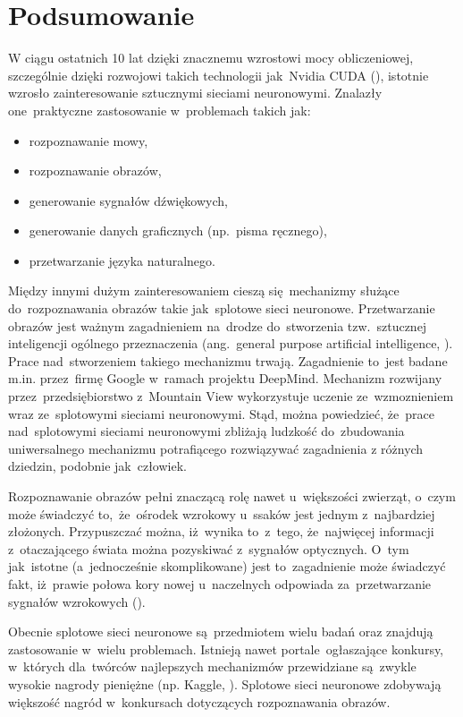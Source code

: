 \chapter{Podsumowanie}
W ciągu ostatnich 10 lat dzięki znacznemu wzrostowi mocy obliczeniowej, szczególnie dzięki rozwojowi takich technologii
jak~Nvidia CUDA (\cite{nvidia-cuda}), istotnie wzrosło zainteresowanie sztucznymi sieciami neuronowymi. Znalazły
one~praktyczne zastosowanie w~problemach takich jak:
\begin{itemize}
    \item rozpoznawanie mowy,
    \item rozpoznawanie obrazów,
    \item generowanie sygnałów dźwiękowych,
    \item generowanie danych graficznych (np.~pisma ręcznego),
    \item przetwarzanie języka naturalnego.
\end{itemize}

Między innymi dużym zainteresowaniem cieszą się~mechanizmy służące do~rozpoznawania obrazów takie jak~splotowe sieci
neuronowe. Przetwarzanie obrazów jest ważnym zagadnieniem na~drodze do~stworzenia tzw.~sztucznej inteligencji ogólnego
przeznaczenia (ang.~general purpose artificial intelligence, \cite{strong-AI}). Prace nad~stworzeniem takiego mechanizmu
trwają. Zagadnienie to~jest badane m.in. przez~firmę Google w~ramach projektu DeepMind. Mechanizm rozwijany
przez~przedsiębiorstwo z~Mountain View wykorzystuje uczenie ze~wzmoznieniem wraz ze~splotowymi sieciami neuronowymi.
Stąd, można powiedzieć, że~prace nad~splotowymi sieciami neuronowymi zbliżają ludzkość do~zbudowania uniwersalnego
mechanizmu potrafiącego rozwiązywać zagadnienia z różnych dziedzin, podobnie jak~człowiek.

Rozpoznawanie obrazów pełni znaczącą rolę nawet u~większości zwierząt, o~czym może świadczyć to,~że~ośrodek wzrokowy
u~ssaków jest jednym z~najbardziej złożonych. Przypuszczać można, iż~wynika to~z~tego, że~najwięcej informacji
z~otaczającego świata można pozyskiwać z~sygnałów optycznych. O~tym jak~istotne (a~jednocześnie skomplikowane) jest
to~zagadnienie może świadczyć fakt, iż~prawie połowa kory nowej u~naczelnych odpowiada za~przetwarzanie sygnałów
wzrokowych (\cite{primate-cerebral-cortex}).

Obecnie splotowe sieci neuronowe są~przedmiotem wielu badań oraz znajdują zastosowanie w~wielu problemach. Istnieją
nawet portale~ogłaszające konkursy, w~których dla~twórców najlepszych mechanizmów przewidziane są~zwykle wysokie nagrody
pieniężne (np. Kaggle, \cite{kaggle-competitions}). Splotowe sieci neuronowe zdobywają większość nagród w~konkursach
dotyczących rozpoznawania obrazów.

